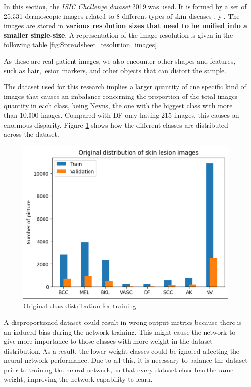 In this section, the \textit{ISIC Challenge dataset}  2019 was used.  It is formed by a set of 25,331 dermoscopic images related to 8 different types of skin diseases \cite{dataset_ref_1}, \cite{dataset_ref_2} y \cite{dataset_ref_3}. The images are stored in \textbf{various resolution sizes that need to be unified into a smaller single-size}. A representation of the image resolution is given in the following table \ref{fig:Spreadsheet_resolution_images}. 

\newpage
As these are real patient images, we also encounter other shapes and features, such as hair, lesion markers, and other objects that can distort the sample.

The dataset used for this research implies a larger quantity of one specific kind of images that causes an imbalance concerning the proportion of the total images quantity in each class, being Nevus, the one with the biggest class with more than 10.000 images. Compared with DF only having 215 images, this causes an enormous disparity. Figure \ref{fig:class_distribution_for_train} shows how the different classes are distributed across the dataset. 

\begin{figure}[ht]
    \centering
        \includegraphics[scale=0.75]{images/Building/Original_distribution_skin_lesion_images.png}
        \caption{Original class distribution for training.}
    \label{fig:class_distribution_for_train}
\end{figure}


A disproportioned dataset could result in wrong output metrics because there is an induced bias during the network training. This might cause the network to give more importance to those classes with more weight in the dataset distribution. As a result, the lower weight classes could be ignored affecting the neural network performance. Due to all this, it is necessary to balance the dataset prior to training the neural network, so that every dataset class has the same weight, improving the network capability to learn. 

